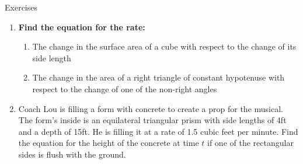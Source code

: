 \documentclass[../revisedmain.tex]{subfiles}
\begin{document}
	\newpage
\begin{center}
	\LARGE Exercises
\end{center}
\begin{enumerate}
	\item \textbf{Find the equation for the rate:}
	\begin{enumerate}
		\item The change in the surface area of a cube with respect to the change of its side length
		\item The change in the area of a right triangle of constant hypotenuse with respect to the change of one of the non-right angles
	\end{enumerate}
	\item Coach Lou is filling a form with concrete to create a prop for the musical. The form's inside is an equilateral triangular prism with side lengths of 4ft and a depth of 15ft. He is filling it at a rate of 1.5 cubic feet per minute. Find the equation for the height of the concrete at time $t$ if one of the rectangular sides is flush with the ground.
\end{enumerate}
\end{document}
